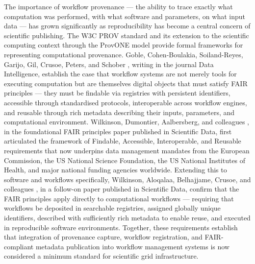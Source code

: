\documentclass[12pt,a4paper]{report}
\begin{document}
The importance of workflow provenance — the ability to trace exactly what computation was performed, with what software and parameters, on what 
input data — has grown significantly as reproducibility has become a central concern of scientific publishing. The W3C PROV standard and its 
extension to the scientific computing context through the ProvONE model provide formal frameworks for representing computational provenance. Goble, 
Cohen-Boulakia, Soiland-Reyes, Garijo, Gil, Crusoe, Peters, and Schober \parencite{goble2020fair}, writing in the journal Data Intelligence, establish the case that
 workflow systems are not merely tools for executing computation but are themselves digital objects that must satisfy FAIR principles — they must 
 be findable via registries with persistent identifiers, accessible through standardised protocols, interoperable across workflow engines, and 
 reusable through rich metadata describing their inputs, parameters, and computational environment. Wilkinson, Dumontier, Aalbersberg, and 
 colleagues \parencite{wilkinson2016fair}, in the foundational FAIR principles paper published in Scientific Data, first articulated the framework of Findable, 
 Accessible, Interoperable, and Reusable requirements that now underpins data management mandates from the European Commission, the US
  National Science Foundation, the US National Institutes of Health, and major national funding agencies worldwide. Extending this to software 
  and workflows specifically, Wilkinson, Aloqalaa, Belhajjame, Crusoe, and colleagues \parencite{wilkinson2025applying}, in a follow-on paper published in Scientific Data, 
  confirm that the FAIR principles apply directly to computational workflows — requiring that workflows be deposited in searchable registries, 
  assigned globally unique identifiers, described with sufficiently rich metadata to enable reuse, and executed in reproducible software environments. 
  Together, these requirements establish that integration of provenance capture, workflow registration, and FAIR-compliant metadata publication into 
  workflow management systems is now considered a minimum standard for scientific grid infrastructure.
\end{document}
